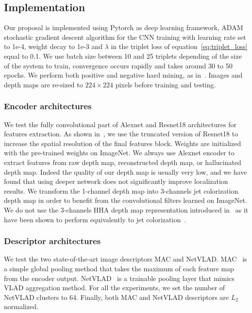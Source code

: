 \subsection{Implementation}
\label{subsec:implementation}

Our proposal is implemented using Pytorch as deep learning framework, ADAM stochastic gradient descent algorithm for the CNN training with learning rate set to 1e-4, weight decay to 1e-3 and $\lambda$ in the triplet loss of equation~\ref{eq:triplet_loss} equal to 0.1. We use batch size between 10 and 25 triplets depending of the size of the system to train, convergence occurs rapidly and takes around 30 to 50 epochs. We perform both positive and negative hard mining, as in~\cite{Radenovic2017}. Images and depth maps are re-sized to $224\times224$ pixels before training and testing.

\subsubsection{Encoder architectures}
We test the fully convolutional part of Alexnet and Resnet18 architectures for features extraction. As shown in~\cite{Piasco2019a}, we use the truncated version of Resnet18 to increase the spatial resolution of the final features block. Weights are initialized with the pre-trained weights on ImageNet. We always use Alexnet encoder to extract features from raw depth map, reconstructed depth map, or hallucinated depth map. Indeed the quality of our depth map is usually very low, and we have found that using deeper network does not significantly improve localization results. We transform the 1-channel depth map into 3-channels jet colorization depth map in order to benefit from the convolutional filters learned on ImageNet. We do not use the 3-channels HHA depth map representation introduced in~\cite{Gupta2014} as it have been shown to perform equivalently to jet colorization~\cite{Eitel2015}.

\subsubsection{Descriptor architectures}
We test the two state-of-the-art image descriptors MAC and NetVLAD. MAC~\cite{Radenovic2016} is a simple global pooling method that takes the maximum of each feature map from the encoder output. NetVLAD~\cite{Arandjelovic2017} is a trainable pooling layer that mimics VLAD aggregation method. For all the experiments, we set the number of NetVLAD clusters to 64. Finally, both MAC and NetVLAD descriptors are $L_{2}$ normalized.


